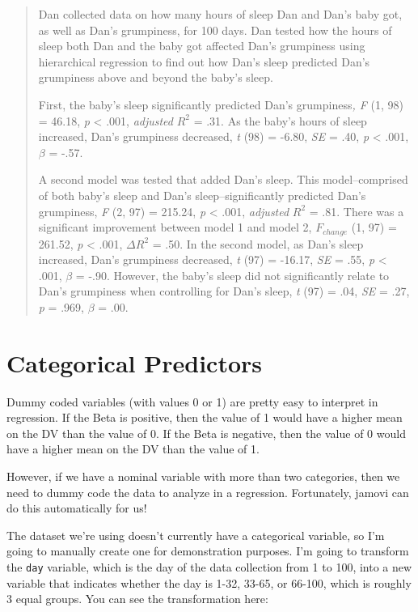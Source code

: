 \documentclass[
]{book}
\begin{document}
\begin{quote}
Dan collected data on how many hours of sleep Dan and Dan's baby got, as well as Dan's grumpiness, for 100 days. Dan tested how the hours of sleep both Dan and the baby got affected Dan's grumpiness using hierarchical regression to find out how Dan's sleep predicted Dan's grumpiness above and beyond the baby's sleep.

First, the baby's sleep significantly predicted Dan's grumpiness\emph{, F} (1, 98) = 46.18, \emph{p} \textless{} .001, \emph{adjusted} \(R^2\) = .31. As the baby's hours of sleep increased, Dan's grumpiness decreased, \emph{t} (98) = -6.80, \emph{SE} = .40, \emph{p} \textless{} .001, \(\beta\) = -.57.

A second model was tested that added Dan's sleep. This model--comprised of both baby's sleep and Dan's sleep--significantly predicted Dan's grumpiness, \emph{F} (2, 97) = 215.24, \emph{p} \textless{} .001, \emph{adjusted} \(R^2\) = .81. There was a significant improvement between model 1 and model 2, \(F_{change}\) (1, 97) = 261.52, \emph{p} \textless{} .001, \(\Delta R^2\) = .50. In the second model, as Dan's sleep increased, Dan's grumpiness decreased, \emph{t} (97) = -16.17, \emph{SE} = .55, \emph{p} \textless{} .001, \(\beta\) = -.90. However, the baby's sleep did not significantly relate to Dan's grumpiness when controlling for Dan's sleep, \emph{t} (97) = .04, \emph{SE} = .27, \emph{p} = .969, \(\beta\) = .00.
\end{quote}

\hypertarget{categorical-predictors}{%
\section{Categorical Predictors}\label{categorical-predictors}}

Dummy coded variables (with values 0 or 1) are pretty easy to interpret in regression. If the Beta is positive, then the value of 1 would have a higher mean on the DV than the value of 0. If the Beta is negative, then the value of 0 would have a higher mean on the DV than the value of 1.

However, if we have a nominal variable with more than two categories, then we need to dummy code the data to analyze in a regression. Fortunately, jamovi can do this automatically for us!

The dataset we're using doesn't currently have a categorical variable, so I'm going to manually create one for demonstration purposes. I'm going to transform the \texttt{day} variable, which is the day of the data collection from 1 to 100, into a new variable that indicates whether the day is 1-32, 33-65, or 66-100, which is roughly 3 equal groups. You can see the transformation here:
\end{document}
